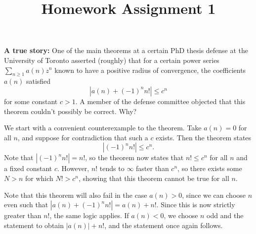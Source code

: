 \documentclass[11pt, letterpaper]{article}
\title{Homework Assignment 1}
\begin{document}
\makeproblem

\textbf{A true story:} One of the main theorems at a certain PhD thesis defense at the University of Toronto asserted (roughly) that for a certain power series $\sum_{n\geq 1} a(n)z^n$ known to have a positive radius of convergence, the coefficients $a(n)$ satisfied
\[
	\left| a(n)+(-1)^nn! \right| \leq c^n
\]
for some constant $c>1$. A member of the defense committee objected that this theorem couldn't possibly be correct. Why?

We start with a convenient counterexample to the theorem. Take $a(n)=0$ for all $n$, and suppose for contradiction that such a $c$ exists. Then the theorem states
\[
	\left| (-1)^nn! \right| \leq c^n
.\]
Note that $\left| (-1)^nn! \right| =n!$, so the theorem now states that $n!\leq c^n$ for all $n$ and a fixed constant $c$. However, $n!$ tends to $\infty $ faster than $c^n$, so there exists some $N>n$ for which $N! > c^n$, showing that this theorem cannot be true for all $n$.

Note that this theorem will also fail in the case $a(n)>0$, since we can choose $n$ even such that $\left| a(n)+(-1)^nn! \right| =a(n)+n!$. Since this is now strictly greater than $n!$, the same logic applies. If $a(n)<0$, we choose $n$ odd and the statement to obtain $\left| a(n) \right| +n!$, and the statement once again follows.
\end{document}
